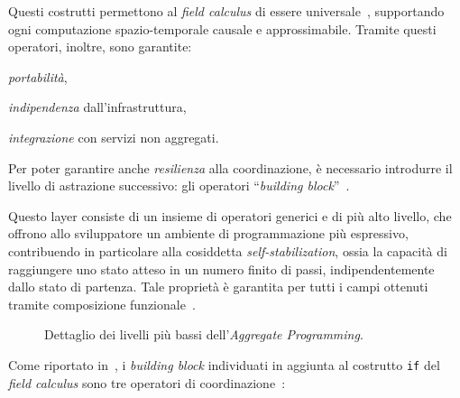 Questi costrutti permettono al \emph{field calculus} di essere universale~\cite{beal2014towards}, supportando ogni computazione spazio-temporale causale e approssimabile.
Tramite questi operatori, inoltre, sono garantite:
\begin{inparaitem}
  \item \emph{portabilità},
  \item \emph{indipendenza} dall'infrastruttura,
  \item \emph{integrazione} con servizi non aggregati.
\end{inparaitem}


Per poter garantire anche \emph{resilienza} alla coordinazione, è necessario introdurre il livello di astrazione successivo:
gli operatori ``\emph{building block}''~\cite{BV-FOCAS2014}.

Questo layer consiste di un insieme di operatori generici e di più alto livello, che offrono allo sviluppatore un ambiente di programmazione più espressivo,
contribuendo in particolare alla cosiddetta \emph{self-stabilization}, ossia la capacità di raggiungere uno stato atteso in un numero finito di passi,
indipendentemente dallo stato di partenza.
Tale proprietà è garantita per tutti i campi ottenuti tramite composizione funzionale~\cite{BV-FOCAS2014}.

\begin{figure}[htbp]
  \centering
  \caption{Dettaglio dei livelli più bassi dell'\emph{Aggregate Programming}.}%
  \label{fig:stack-detail}
\end{figure}

Come riportato in~, i \emph{building block} individuati in aggiunta al costrutto \texttt{if} del \emph{field calculus} sono tre operatori di coordinazione~\cite{7274429,BV-FOCAS2014}:

